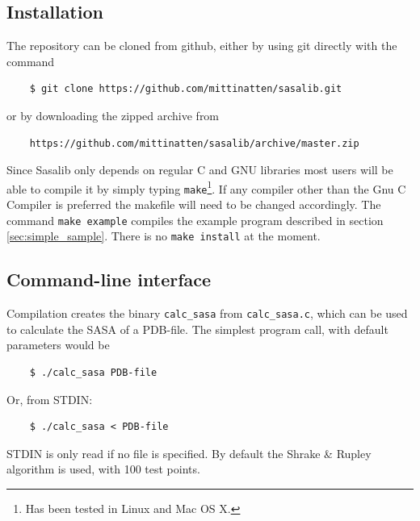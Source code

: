 \documentclass[a4paper,11pt]{article}
\begin{document}
\subsection{Installation} \label{sec:installing}

The repository can be cloned from github, either by using git directly
with the command
\begin{verbatim}
    $ git clone https://github.com/mittinatten/sasalib.git
\end{verbatim}
or by downloading the zipped archive from
\begin{verbatim}
    https://github.com/mittinatten/sasalib/archive/master.zip
\end{verbatim}
Since Sasalib only depends on regular C and GNU libraries most users
will be able to compile it by simply typing \texttt{make}\footnote{Has
  been tested in Linux and Mac OS X.}. If any compiler other than the
Gnu C Compiler is preferred the makefile will need to be changed
accordingly. The command \texttt{make example} compiles the example
program described in section \ref{sec:simple_sample}. There is no
\texttt{make install} at the moment.

\subsection{Command-line interface}

Compilation creates the binary \texttt{calc\_sasa} from
\texttt{calc\_sasa.c}, which can be used to calculate the SASA of a
PDB-file. The simplest program call, with default parameters would be
\begin{verbatim}
    $ ./calc_sasa PDB-file
\end{verbatim}
Or, from STDIN:
\begin{verbatim} 
    $ ./calc_sasa < PDB-file    
\end{verbatim}
STDIN is only read if no file is specified.  By default the Shrake \&
Rupley algorithm is used, with 100 test points. 
\end{document}
